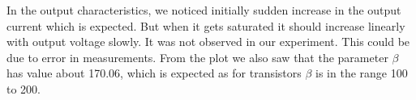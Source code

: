 \documentclass[12pt]{article}
\begin{document}
In the output characteristics, we noticed initially sudden increase in the output current which is expected. But when it gets saturated it should increase linearly with output voltage slowly. It was not observed in our experiment. This could be due to error in measurements. From the plot we also saw that the parameter \( \beta \) has value about 170.06, which is expected as for transistors \(\beta \) is in the range 100 to 200.
\end{document}
